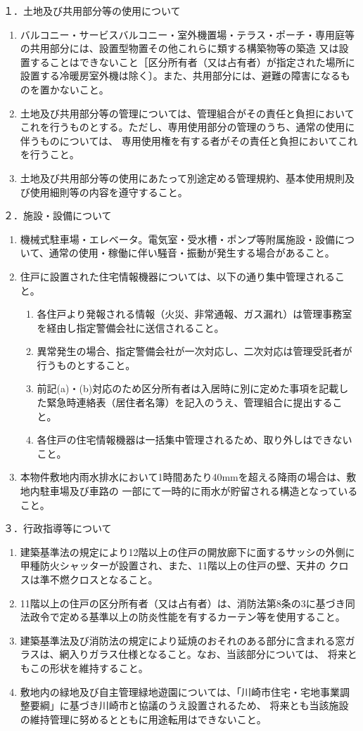 \documentclass[
  luatex,
  paper=a4paper,
  fontsize=11pt,
  jafontsize=11pt,
  jlreq_notes,
]{jlreq}
\begin{document}
  \noindent
  １．土地及び共用部分等の使用について
  \begin{enumerate}
    \item バルコニー・サービスバルコニー・室外機置場・テラス・ポーチ・専用庭等の共用部分には、設置型物置その他これらに類する構築物等の築造
    又は設置することはできないこと［区分所有者（又は占有者）が指定された場所に設置する冷暖房室外機は除く〕。また、共用部分には、避難の障害になるものを置かないこと。
    \item 土地及び共用部分等の管理については、管理組合がその責任と負担においてこれを行うものとする。ただし、専用使用部分の管理のうち、通常の使用に伴うものについては、
          専用使用権を有する者がその責任と負担においてこれを行うこと。
    \item 土地及び共用部分等の使用にあたって別途定める管理規約、基本使用規則及び使用細則等の内容を遵守すること。
  \end{enumerate}
  ２．施設・設備について
  \begin{enumerate}
    \item 機械式駐車場・エレベータ。電気室・受水槽・ポンプ等附属施設・設備について、通常の使用・稼働に伴い騒音・振動が発生する場合があること。
    \item 住戸に設置された住宅情報機器については、以下の通り集中管理されること。
      \begin{enumerate}
        \item 各住戸より発報される情報（火災、非常通報、ガス漏れ）は管理事務室を経由し指定警備会社に送信されること。
        \item 異常発生の場合、指定警備会社が一次対応し、二次対応は管理受託者が行うものとすること。
        \item 前記(a)・(b)対応のため区分所有者は入居時に別に定めた事項を記載した緊急時連絡表（居住者名簿）を記入のうえ、管理組合に提出すること。
        \item 各住戸の住宅情報機器は一括集中管理されるため、取り外しはできないこと。
      \end{enumerate}
  \item 本物件敷地内雨水排水において1時間あたり40mmを超える降雨の場合は、敷地内駐車場及び車路の
        一部にて一時的に雨水が貯留される構造となっていること。
  \end{enumerate}
  ３．行政指導等について
  \begin{enumerate}
  \item 建築基準法の規定により12階以上の住戸の開放廊下に面するサッシの外側に甲種防火シャッターが設置され、また、11階以上の住戸の壁、天井の クロスは準不燃クロスとなること。
  \item 11階以上の住戸の区分所有者（又は占有者）は、消防法第8条の3に基づき同法政令で定める基準以上の防炎性能を有するカーテン等を使用すること。
  \item 建築基準法及び消防法の規定により延焼のおそれのある部分に含まれる窓ガラスは、網入りガラス仕様となること。なお、当該部分については、
        将来ともこの形状を維持すること。
  \item 敷地内の緑地及び自主管理緑地遊園については、「川崎市住宅・宅地事業調整要綱」に基づき川崎市と協議のうえ設置されるため、
        将来とも当該施設の維持管理に努めるとともに用途転用はできないこと。
  \end{enumerate}
\end{document}
